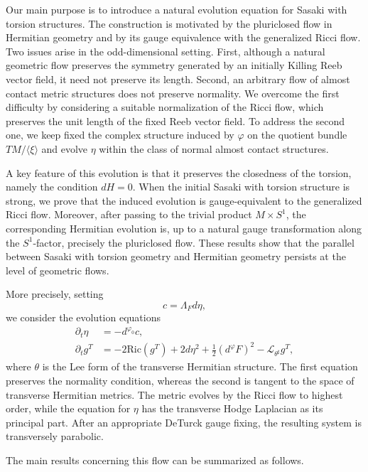 \documentclass{article}
\theoremstyle{definition}
\newcommand{\Ric}{\mathrm{Ric}}
\renewcommand{\phi}{\varphi}
\numberwithin{equation}{section}
\begin{document}
Our main purpose is to introduce a natural evolution equation for Sasaki with torsion structures. The construction is motivated by the pluriclosed flow in Hermitian geometry and by its gauge equivalence with the generalized Ricci flow. Two issues arise in the odd-dimensional setting. First, although a natural geometric flow preserves the symmetry generated by an initially Killing Reeb vector field, it need not preserve its length. Second, an arbitrary flow of almost contact metric structures does not preserve normality. We overcome the first difficulty by considering a suitable normalization of the Ricci flow, which preserves the unit length of the fixed Reeb vector field. To address the second one, we keep fixed the complex structure induced by $\phi$ on the quotient bundle $TM/\langle\xi\rangle$ and evolve $\eta$ within the class of normal almost contact structures.

A key feature of this evolution is that it preserves the closedness of the
torsion, namely the condition $dH=0$. When the initial Sasaki with torsion
structure is strong, we prove that the induced evolution is gauge-equivalent
to the generalized Ricci flow. Moreover, after passing to the trivial product
$M\times S^1$, the corresponding Hermitian evolution is, up to a natural
gauge transformation along the $S^1$-factor, precisely the pluriclosed flow.
These results show that the parallel between Sasaki with torsion geometry
and Hermitian geometry persists at the level of geometric flows. 

More precisely, setting
\[
c=\Lambda_Fd\eta,
\]
we consider the evolution equations
\[
\begin{aligned}
\partial_t\eta
&=
-d^{\phi_0}c,\\
\partial_tg^T
&=
-2\Ric(g^T)
+2d\eta^2
+\frac12(d^\phi F)^2
-\mathcal L_{\theta^\sharp}g^T,
\end{aligned}
\]
where $\theta$ is the Lee form of the transverse Hermitian structure. The first equation preserves the normality condition, whereas the second is tangent to the space of transverse Hermitian metrics. The metric evolves by the Ricci flow to highest order, while the equation for $\eta$ has the transverse Hodge Laplacian as its principal part. After an appropriate DeTurck gauge fixing, the resulting system is transversely parabolic.

The main results concerning this flow can be summarized as follows.
\end{document}
